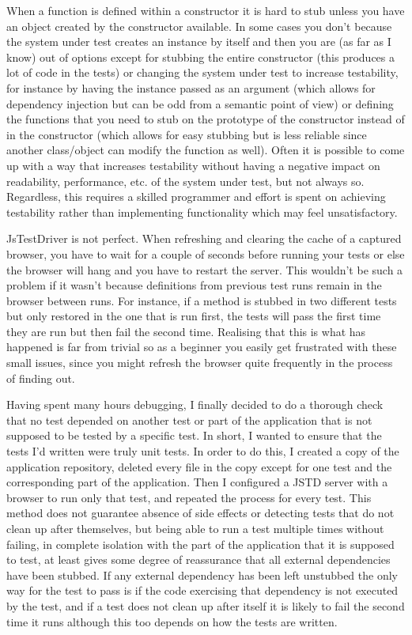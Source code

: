 \documentclass[11pt]{article}
\begin{document}
When a function is defined within a constructor it is hard to stub unless you have an object created by the constructor available. In some cases you don't because the system under test creates an instance by itself and then you are (as far as I know) out of options except for stubbing the entire constructor (this produces a lot of code in the tests) or changing the system under test to increase testability, for instance by having the instance passed as an argument (which allows for dependency injection but can be odd from a semantic point of view) or defining the functions that you need to stub on the prototype of the constructor instead of in the constructor (which allows for easy stubbing but is less reliable since another class/object can modify the function as well). Often it is possible to come up with a way that increases testability without having a negative impact on readability, performance, etc. of the system under test, but not always so. Regardless, this requires a skilled programmer and effort is spent on achieving testability rather than implementing functionality which may feel unsatisfactory.

JsTestDriver is not perfect. When refreshing and clearing the cache of a captured browser, you have to wait for a couple of seconds before running your tests or else the browser will hang and you have to restart the server. This wouldn't be such a problem if it wasn't because definitions from previous test runs remain in the browser between runs. For instance, if a method is stubbed in two different tests but only restored in the one that is run first, the tests will pass the first time they are run but then fail the second time. Realising that this is what has happened is far from trivial so as a beginner you easily get frustrated with these small issues, since you might refresh the browser quite frequently in the process of finding out.

Having spent many hours debugging, I finally decided to do a thorough check that no test depended on another test or part of the application that is not supposed to be tested by a specific test. In short, I wanted to ensure that the tests I'd written were truly unit tests. In order to do this, I created a copy of the application repository, deleted every file in the copy except for one test and the corresponding part of the application. Then I configured a JSTD server with a browser to run only that test, and repeated the process for every test. This method does not guarantee absence of side effects or detecting tests that do not clean up after themselves, but being able to run a test multiple times without failing, in complete isolation with the part of the application that it is supposed to test, at least gives some degree of reassurance that all external dependencies have been stubbed. If any external dependency has been left unstubbed the only way for the test to pass is if the code exercising that dependency is not executed by the test, and if a test does not clean up after itself it is likely to fail the second time it runs although this too depends on how the tests are written.
\end{document}
